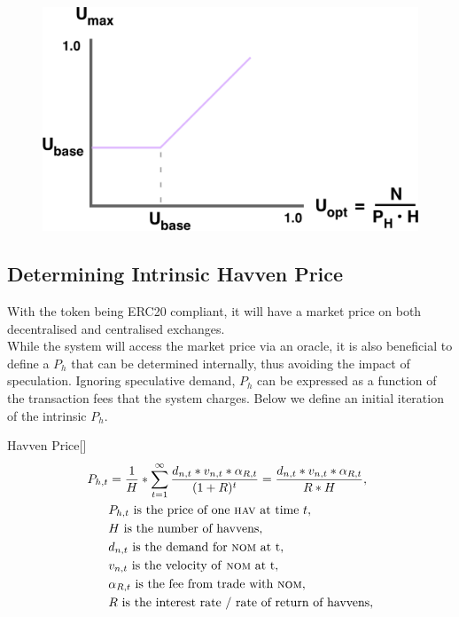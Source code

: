 \begin{figure}[h!]
    \centering
    \includegraphics[width=.75\textwidth]{img/U_max}
\end{figure}

\newpage

\subsection{Determining Intrinsic Havven Price} With the \HAV{} token being ERC20 compliant, it will have a market price on both decentralised and centralised exchanges. \\

\noindent While the system will access the market price via an oracle, it is also beneficial to define a $P_h$ that can be determined internally, thus avoiding the impact of speculation. Ignoring speculative demand, $P_h$ can be expressed as a function of the transaction fees that the system charges. Below we define an initial iteration of the intrinsic $P_h$.

\begin{namedthm}{Havven Price}[]
\begin{align*} 
P_{h,t} &= \frac{1}{H}* \sum\limits_{t=1}^\infty \frac{d_{n,t} *v_{n,t} * \alpha_{R,t}}{(1+R)^t} = \frac{d_{n,t} *v_{n,t} * \alpha_{R,t}}{R * H}, \\
& P_{h,t} \text{ is the price of one \textsc{hav}{} at time } t, \\
& H \text{ is the number of havvens}, \\
& d_{n,t} \text{ is the demand for \textsc{nom}{} at t}, \\
& v_{n,t} \text{ is the velocity of \textsc{nom}{} at t}, \\
& \alpha_{R,t} \text{ is the fee from trade with \textsc{nom}{}}, \\
& R \text{ is the interest rate / rate of return of havvens}, \\
\end{align*}
\end{namedthm}


